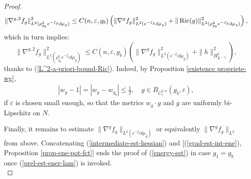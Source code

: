\documentclass[a4paper,11pt,reqno]{amsart}
\def\Ric{\mathop{\rm Ric}\nolimits}
\def\Ric{\mathop{\rm Ric}\nolimits}
\numberwithin{equation}{section}
\begin{document}
\begin{proof}
\begin{equation*}
		\|\nabla^{g,2}f_g\|_{L^2(\rho_{g_b}^2e^{-f_g}d\mu_g)}^2\leq C(n,\varepsilon,g_b)\left(\|\nabla^gf_g\|^2_{L^2(e^{-f_g}d\mu_g)}+\|\Ric(g)\|_{L^2(\rho_{g_b}^2e^{-f_g}d\mu_g)}^2\right),
		\end{equation*}
		which in turn implies:
		\begin{equation}
		\|\nabla^{g,2}f_g\|_{L^2(\rho_{g_b}^2e^{-f_g}d\mu_g)}^2\leq C(n,\varepsilon,g_b)\left(\|\nabla^gf_g\|^2_{L^2(e^{-f_g}d\mu_g)}+\|h\|_{H^2_{\frac{n}{2}-1}}^2\right),\label{intermediate-est-hessian}
		\end{equation}
		thanks to (\ref{L^2-a-priori-bound-Ric}). Indeed, by Proposition \ref{existence propriete-wg}, 
		\begin{eqnarray}
		|w_g-1|=|w_g-w_{g_b}|\leq \frac{1}{2},\quad g\in B_{C^{2,\alpha}_{\tau}}(g_b,\varepsilon),\label{c^0-est-pot-fct}
		\end{eqnarray}
		if $\varepsilon$ is chosen small enough, so that the metrics $w_g\cdot g$ and $g$ are uniformly bi-Lipschitz on $N$. 
		
		
		
		Finally, it remains to estimate $\|\nabla^gf_g\|_{L^2(e^{-f_g}d\mu_g)}$ or equivalently $\|\nabla^gf_g\|_{L^2}$  from above. Concatenating (\ref{intermediate-est-hessian}) and [(\ref{grad-est-int-ene}), Proposition \ref{prop-ene-pot-fct}] ends the proof of (\ref{energy-est}) in case $g_1=g_b$ once (\ref{prel-est-ener-lam}) is invoked.\\
		

\end{proof}
\end{document}
